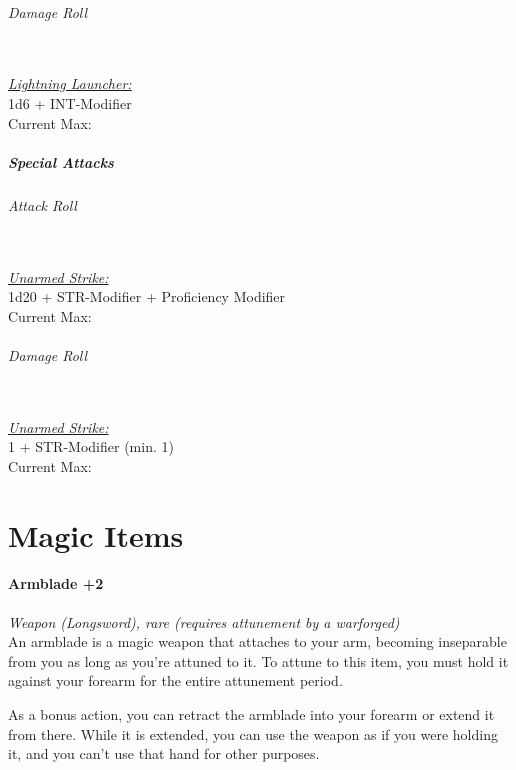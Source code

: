 \documentclass[letterpaper,openany,oneside,twocolumn]{book}
\begin{document}
\paragraph*{Damage Roll}\hfill\\
\underline{\textit{Lightning Launcher:}}\\
1d6 + INT-Modifier\\
\indent Current Max: 
\subsubsection*{Special Attacks}
\paragraph*{Attack Roll}\hfill\\
\underline{\textit{Unarmed Strike:}}\\
1d20 + STR-Modifier + Proficiency Modifier\\
\indent Current Max: 
\paragraph*{Damage Roll}\hfill\\
\underline{\textit{Unarmed Strike:}}\\
1 + STR-Modifier (min. 1)\\
\indent Current Max: 

\part*{Magic Items}

\subsection*{Armblade +2}
\textit{Weapon (Longsword), rare (requires attunement by a warforged)}\\
An armblade is a magic weapon that attaches to your arm, becoming inseparable from you as long as you're attuned to it. To attune to this item, you must hold it against your forearm for the entire attunement period.

As a bonus action, you can retract the armblade into your forearm or extend it from there. While it is extended, you can use the weapon as if you were holding it, and you can't use that hand for other purposes.
\end{document}
